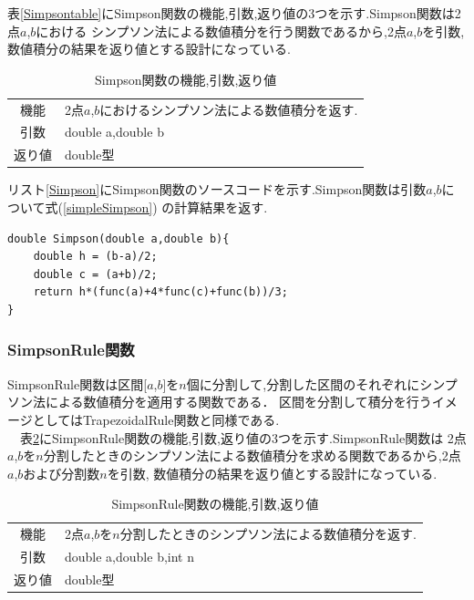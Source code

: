 \documentclass[dvipdfmx]{jarticle}
\begin{document}
    表\ref{Simpsontable}にSimpson関数の機能,引数,返り値の3つを示す.Simpson関数は2点$a$,$b$における
    シンプソン法による数値積分を行う関数であるから,2点$a$,$b$を引数,数値積分の結果を返り値とする設計になっている.
    \begin{table}[H]
      \caption{Simpson関数の機能,引数,返り値}
      \label{SimpsonTtable}
      \begin{center}
          \begin{tabular}{c|l}\hline
        機能 & 2点$a$,$b$におけるシンプソン法による数値積分を返す.\\
        引数 & double a,double b\\
        返り値 & double型 \\ \hline
          \end{tabular}
      \end{center}
      \end{table}

      リスト\ref{Simpson}にSimpson関数のソースコードを示す.Simpson関数は引数$a$,$b$について式(\ref{simpleSimpson})
      の計算結果を返す.
      \begin{lstlisting}[basicstyle=\ttfamily\footnotesize, frame=single,label=Simpson,caption=Simpson関数]
double Simpson(double a,double b){
    double h = (b-a)/2;
    double c = (a+b)/2;
    return h*(func(a)+4*func(c)+func(b))/3;
}
      \end{lstlisting}

    \subsubsection{SimpsonRule関数}
    SimpsonRule関数は区間[$a$,$b$]を$n$個に分割して,分割した区間のそれぞれにシンプソン法による数値積分を適用する関数である．
    区間を分割して積分を行うイメージとしてはTrapezoidalRule関数と同様である.\\
    　表\ref{SimpsonRuleTtable}にSimpsonRule関数の機能,引数,返り値の3つを示す.SimpsonRule関数は
    2点$a$,$b$を$n$分割したときのシンプソン法による数値積分を求める関数であるから,2点$a$,$b$および分割数$n$を引数,
    数値積分の結果を返り値とする設計になっている.

    \begin{table}[H]
      \caption{SimpsonRule関数の機能,引数,返り値}
      \label{SimpsonRuleTtable}
      \begin{center}
          \begin{tabular}{c|l}\hline
        機能 & 2点$a$,$b$を$n$分割したときのシンプソン法による数値積分を返す.\\
        引数 & double a,double b,int n\\
        返り値 & double型 \\ \hline
          \end{tabular}
      \end{center}
      \end{table}
\end{document}
